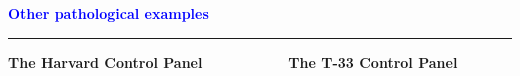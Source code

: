 \documentclass[pdf]{beamer}
\begin{document}
\begin{frame}
    \textcolor{Blue}{\textbf{\Large{Other pathological examples}}}
    \textcolor{red}{\rule{10cm}{1mm}}
    
{\normalsize \textbf{ The Harvard Control Panel \ \ \ \ \ \ \ \ \ \ The T-33 Control Panel}}



\end{frame}
\end{document}
